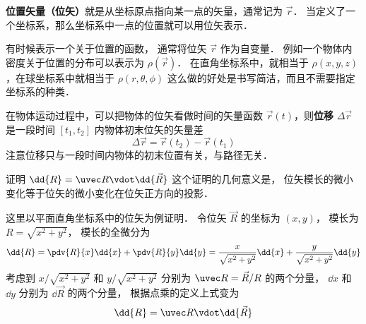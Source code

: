 

\textbf{位置矢量（位矢）}就是从坐标原点指向某一点的矢量，通常记为 $\vec r$． 当定义了一个坐标系，那么坐标系中一点的位置就可以用位矢表示．

有时候表示一个关于位置的函数， 通常将位矢 $\vec r$ 作为自变量． 例如一个物体内密度关于位置的分布可以表示为 $\rho(\vec r)$． 在直角坐标系中，就相当于 $\rho(x,y,z)$，在球坐标系中就相当于 $\rho(r,\theta,\phi)$ 这么做的好处是书写简洁，而且不需要指定坐标系的种类．

在物体运动过程中，可以把物体的位矢看做时间的矢量函数 $\vec r(t)$，则\textbf{位移} $\Delta \vec r$ 是一段时间 $[t_1,t_2]$ 内物体初末位矢的矢量差
\begin{equation}
\Delta \vec r = \vec r(t_2) - \vec r(t_1)
\end{equation}
注意位移只与一段时间内物体的初末位置有关，与路径无关．

\begin{exam}{证明 $\dd{R} = \uvec R \vdot \dd{\vec R}$}\label{Disp_ex1}
这个证明的几何意义是， 位矢模长的微小变化等于位矢的微小变化在位矢正方向的投影．

这里以平面直角坐标系中的位矢为例证明． 令位矢 $\vec R$ 的坐标为 $(x, y)$， 模长为 $R = \sqrt{x^2 + y^2}$，
模长的全微分为
\begin{equation}
\dd{R} = \pdv{R}{x} \dd{x} + \pdv{R}{y} \dd{y} = \frac{x}{\sqrt{x^2 + y^2}} \dd{x} + \frac{y}{\sqrt{x^2 + y^2}} \dd{y}
\end{equation}
考虑到 $x/\sqrt{x^2 + y^2}$ 和 $y/\sqrt{x^2 + y^2}$ 分别为 $\uvec R = \vec R/R$ 的两个分量， $\dd{x}$ 和 $\dd{y}$ 分别为 $\dd{\vec R}$ 的两个分量， 根据点乘的定义上式变为
\begin{equation}
\dd{R} = \uvec R \vdot \dd{\vec R}
\end{equation}
\end{exam}


